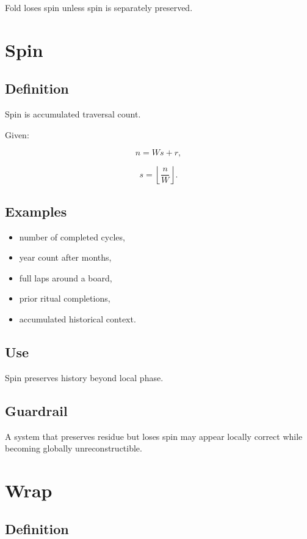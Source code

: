 \documentclass[11pt]{book}
\begin{document}
Fold loses spin unless spin is separately preserved.

\section{Spin}

\subsection*{Definition}

Spin is accumulated traversal count.

Given:

\[
n = Ws + r,
\]

\[
s = \left\lfloor \frac{n}{W} \right\rfloor.
\]

\subsection*{Examples}

\begin{itemize}
    \item number of completed cycles,
    \item year count after months,
    \item full laps around a board,
    \item prior ritual completions,
    \item accumulated historical context.
\end{itemize}

\subsection*{Use}

Spin preserves history beyond local phase.

\subsection*{Guardrail}

A system that preserves residue but loses spin may appear locally correct while becoming globally unreconstructible.

\section{Wrap}

\subsection*{Definition}
\end{document}
